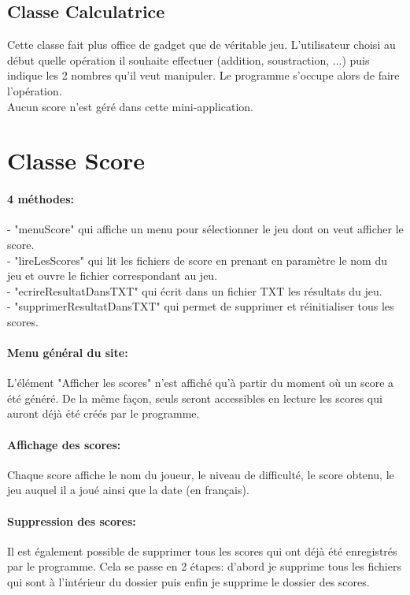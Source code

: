 \documentclass[10pt]{report}
\begin{document}
		\subsection{Classe Calculatrice}
		Cette classe fait plus office de gadget que de véritable jeu. L'utilisateur choisi au début quelle opération il souhaite effectuer (addition, soustraction, ...) puis indique les 2 nombres qu'il veut manipuler. Le programme s'occupe alors de faire l'opération.\\
		Aucun score n'est géré dans cette mini-application.


	\section{Classe Score}
		\paragraph{4 méthodes:\\}
		- "menuScore" qui affiche un menu pour sélectionner le jeu dont on veut afficher le score.\\
		- "lireLesScores" qui lit les fichiers de score en prenant en paramètre le nom du jeu et ouvre le fichier correspondant au jeu.\\
		- "ecrireResultatDansTXT" qui écrit dans un fichier TXT les résultats du jeu.\\
		- "supprimerResultatDansTXT" qui permet de supprimer et réinitialiser tous les scores.

		\paragraph{Menu général du site:\\}
		L'élément "Afficher les scores" n'est affiché qu'à partir du moment où un score a été généré. De la même façon, seuls seront accessibles en lecture les scores qui auront déjà été créés par le programme.

		\paragraph{Affichage des scores:\\}
		Chaque score affiche le nom du joueur, le niveau de difficulté, le score obtenu, le jeu auquel il a joué ainsi que la date (en français).

		\paragraph{Suppression des scores:\\}
		Il est également possible de supprimer tous les scores qui ont déjà été enregistrés par le programme. Cela se passe en 2 étapes: d'abord je supprime tous les fichiers qui sont à l'intérieur du dossier puis enfin je supprime le dossier des scores.
\end{document}
